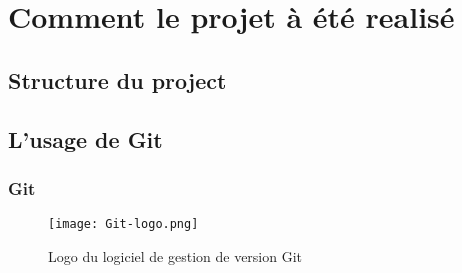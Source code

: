\appendix
\chapter{Comment le projet à été realisé}
\section{Structure du project}
\section{L'usage de Git}
\subsection{Git}

\begin{figure}
\centering
\texttt{[image: Git-logo.png]}
\caption{Logo du logiciel de gestion de version Git}
\end{figure}